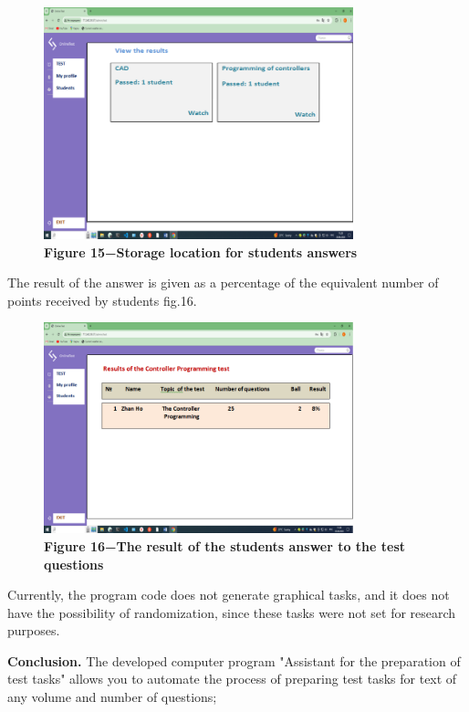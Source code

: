 \begin{figure}[H]
	\centering
	\includegraphics[width=0.8\textwidth]{assets/140}
	\caption*{\bfseries Figure 15−Storage location for students\textquotesingle{}
	answers}
\end{figure}

The result of the answer is given as a percentage of the equivalent
number of points received by students fig.16.

\begin{figure}[H]
	\centering
	\includegraphics[width=0.8\textwidth]{assets/141}
	\caption*{\bfseries Figure 16−The result of the student\textquotesingle s answer to
	the test questions}
\end{figure}


Currently, the program code does not generate graphical tasks, and it
does not have the possibility of randomization, since these tasks were
not set for research purposes.

{\bfseries Conclusion.} The developed computer program "Assistant for the
preparation of test tasks" allows you to automate the process of
preparing test tasks for text of any volume and number of questions;

